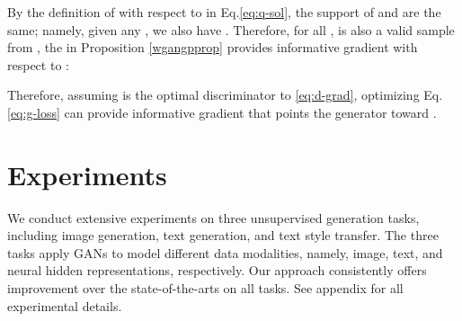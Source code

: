 \documentclass{article}
\newcommand{\0}{\bm{0}}
\begin{document}
By the definition of  with respect to  in Eq.\eqref{eq:q-sol}, the support of  and  are the same; namely, given any , we also have . Therefore, for all ,  is also a valid sample from , the  in {Proposition \ref{wgangpprop}} provides informative gradient with respect to :

Therefore, assuming  is the optimal discriminator to \eqref{eq:d-grad}, optimizing Eq.\eqref{eq:g-loss} can provide informative gradient that points the generator  toward .
 
 
 
\section{Experiments} \label{sec:results}
We conduct extensive experiments on three unsupervised generation tasks, including image generation, text generation, and text style transfer. The three tasks apply GANs to model different data modalities, namely, image, text, and neural hidden representations, respectively. Our approach consistently offers improvement over the state-of-the-arts on all tasks. See appendix for all experimental details.
\end{document}
